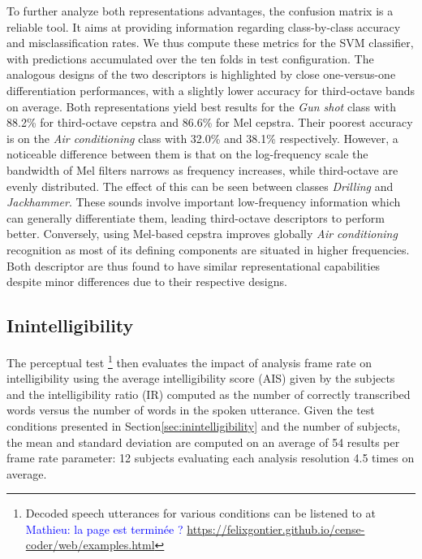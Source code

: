 \documentclass[sensors,article,submit,moreauthors,pdftex,10pt,a4paper]{mdpi}
\newcommand{\ml}[1]{\textcolor{blue}{ Mathieu: #1}}
\begin{document}
To further analyze both representations advantages, the confusion matrix is a reliable tool. It aims at providing information regarding class-by-class accuracy and misclassification rates. We thus compute these metrics for the SVM classifier, with predictions accumulated over the ten folds in test configuration. The analogous designs of the two descriptors is highlighted by close one-versus-one differentiation performances, with a slightly lower accuracy for third-octave bands on average. Both representations yield best results for the \textit{Gun shot} class with 88.2\% for third-octave cepstra and 86.6\% for Mel cepstra. Their poorest accuracy is on the \textit{Air conditioning} class with 32.0\% and 38.1\% respectively. However, a noticeable difference between them is that on the log-frequency scale the bandwidth of Mel filters narrows as frequency increases, while third-octave are evenly distributed. The effect of this can be seen between classes \textit{Drilling} and \textit{Jackhammer}. These sounds involve important low-frequency information which can generally differentiate them, leading third-octave descriptors to perform better. Conversely, using Mel-based cepstra improves globally \textit{Air conditioning} recognition as most of its defining components are situated in higher frequencies.\\

Both descriptor are thus found to have similar representational capabilities despite minor differences due to their respective designs.


\subsection{Inintelligibility}

The perceptual test \footnote{Decoded speech utterances for various conditions can be listened to at \ml{la page est terminée ?} \url{https://felixgontier.github.io/cense-coder/web/examples.html}} then evaluates the impact of analysis frame rate on intelligibility using the average intelligibility score (AIS) given by the subjects and the intelligibility ratio (IR) computed as the number of correctly transcribed words versus the number of words in the spoken utterance. Given the test conditions presented in Section\ref{sec:inintelligibility} and the number of subjects, the mean and standard deviation are computed on an average of 54 results per frame rate parameter: 12 subjects evaluating each analysis resolution 4.5 times on average.
\end{document}

